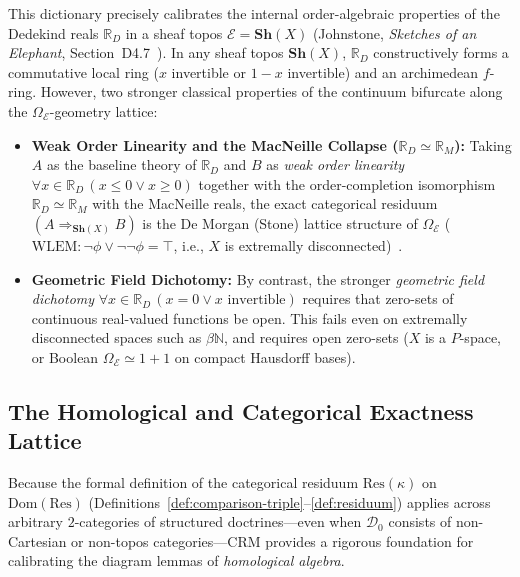 This dictionary precisely calibrates the internal order-algebraic properties of the Dedekind reals $\mathbb{R}_D$ in a sheaf topos $\mathcal{E} = \mathbf{Sh}(X)$ (Johnstone, \emph{Sketches of an Elephant}, Section~D4.7~\cite{Johnstone02}). In any sheaf topos $\mathbf{Sh}(X)$, $\mathbb{R}_D$ constructively forms a commutative local ring ($x$ invertible or $1-x$ invertible) and an archimedean $f$-ring. However, two stronger classical properties of the continuum bifurcate along the $\Omega_{\mathcal{E}}$-geometry lattice:

\begin{itemize}

  \item \textbf{Weak Order Linearity and the MacNeille Collapse ($\mathbb{R}_D \simeq \mathbb{R}_M$):} Taking $A$ as the baseline theory of $\mathbb{R}_D$ and $B$ as \emph{weak order linearity} $\forall x \in \mathbb{R}_D\,(x \le 0 \vee x \ge 0)$ together with the order-completion isomorphism $\mathbb{R}_D \simeq \mathbb{R}_M$ with the MacNeille reals, the exact categorical residuum $(A \Rightarrow_{\mathbf{Sh}(X)} B)$ is the De Morgan (Stone) lattice structure of $\Omega_{\mathcal{E}}$ ($\mathrm{WLEM}: \neg\phi \vee \neg\neg\phi = \top$, i.e., $X$ is extremally disconnected)~\cite{Johnstone02}.

  \item \textbf{Geometric Field Dichotomy:} By contrast, the stronger \emph{geometric field dichotomy} $\forall x \in \mathbb{R}_D\,(x = 0 \vee x \text{ invertible})$ requires that zero-sets of continuous real-valued functions be open. This fails even on extremally disconnected spaces such as $\beta\mathbb{N}$, and requires open zero-sets ($X$ is a $P$-space, or Boolean $\Omega_{\mathcal{E}} \simeq 1+1$ on compact Hausdorff bases).

\end{itemize}

\subsection{The Homological and Categorical Exactness Lattice}

Because the formal definition of the categorical residuum $\mathrm{Res}(\kappa)$ on $\mathrm{Dom}(\mathrm{Res})$ (Definitions~\ref{def:comparison-triple}--\ref{def:residuum}) applies across arbitrary $2$-categories of structured doctrines---even when $\mathcal{D}_0$ consists of non-Cartesian or non-topos categories---$\mathrm{CRM}$ provides a rigorous foundation for calibrating the diagram lemmas of \emph{homological algebra}.


